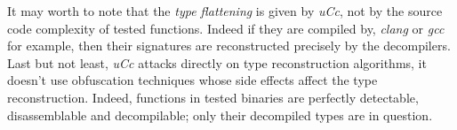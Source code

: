 \documentclass[a4paper]{llncs}
\begin{document}
It may worth to note that the \emph{type flattening} is given by \emph{uCc}, not by the source code
complexity of tested functions. Indeed if they are compiled by, \emph{clang} or \emph{gcc} for example,
then their signatures are reconstructed precisely
by the decompilers. Last but not least, \emph{uCc} attacks directly on type reconstruction algorithms,
it doesn't use obfuscation techniques
whose side effects affect the type
reconstruction. Indeed, functions in tested binaries are perfectly detectable, disassemblable and
decompilable; only their decompiled types are in question.


\end{document}
